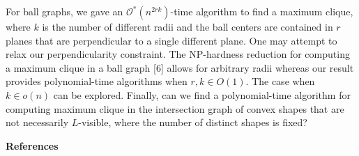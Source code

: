 \documentclass[10pt,a4paper]{amsart}
\begin{document}
\par
\par
For ball graphs, we gave an $\mathcal{O}^{*}(n^{2rk})$-time algorithm to find a maximum clique, where $k$ is the number of different radii and the ball centers are contained in $r$ planes that are perpendicular to a single different plane. One may attempt to relax our perpendicularity constraint. The NP-hardness reduction for computing a maximum clique in a ball graph [6] allows for arbitrary radii whereas our result provides polynomial-time algorithms when $r,k\in O(1)$. The case when $k\in o(n)$ can be explored. Finally, can we find a polynomial-time algorithm for computing maximum clique in the intersection graph of convex shapes that are not necessarily $L$-visible, where the number of distinct shapes is fixed?
\par
\par
\par
\par\medskip\noindent\textbf{References}\par
\end{document}
